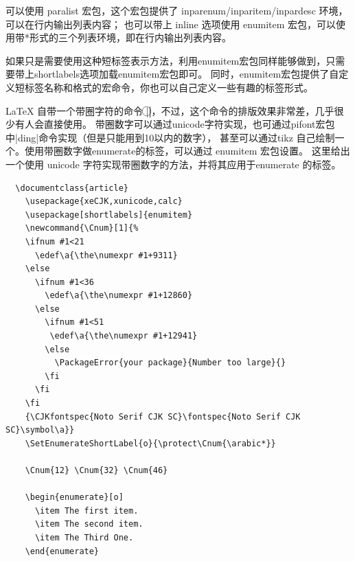 可以使用 paralist 宏包，这个宏包提供了 inparenum/inparitem/inpardesc 环境，可以在行内输出列表内容；
也可以带上 inline 选项使用 enumitem 宏包，可以使用带*形式的三个列表环境，即在行内输出列表内容。



如果只是需要使用这种短标签表示方法，利用enumitem宏包同样能够做到，只需要带上shortlabels选项加载enumitem宏包即可。
同时，enumitem宏包提供了自定义短标签名称和格式的宏命令，你也可以自己定义一些有趣的标签形式。



\LaTeX{} 自带一个带圈字符的命令 |\textcircled|，不过，这个命令的排版效果非常差，几乎很少有人会直接使用。
带圈数字可以通过unicode字符实现，也可通过pifont宏包中|ding|命令实现（但是只能用到10以内的数字），
甚至可以通过tikz 自己绘制一个。使用带圈数字做enumerate的标签，可以通过 enumitem 宏包设置。
这里给出一个使用 unicode 字符实现带圈数字的方法，并将其应用于enumerate 的标签。

\begin{verbatim}
  \documentclass{article}
    \usepackage{xeCJK,xunicode,calc}
    \usepackage[shortlabels]{enumitem}
    \newcommand{\Cnum}[1]{%
    \ifnum #1<21
      \edef\a{\the\numexpr #1+9311}
    \else
      \ifnum #1<36
        \edef\a{\the\numexpr #1+12860}
      \else
        \ifnum #1<51
         \edef\a{\the\numexpr #1+12941}
        \else
          \PackageError{your package}{Number too large}{}
        \fi
      \fi
    \fi
    {\CJKfontspec{Noto Serif CJK SC}\fontspec{Noto Serif CJK SC}\symbol\a}}
    \SetEnumerateShortLabel{o}{\protect\Cnum{\arabic*}}
    
    \Cnum{12} \Cnum{32} \Cnum{46} 
    
    \begin{enumerate}[o]
      \item The first item.
      \item The second item.
      \item The Third One.
    \end{enumerate}
    
\end{verbatim}



